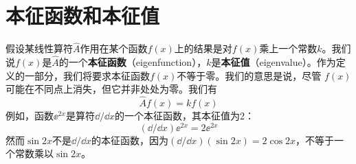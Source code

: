\section{本征函数和本征值}
\label{sec:3.2 Eigenfunctions and Eigenvalues}
	假设某线性算符$\hat{A}$作用在某个函数$f\left(x\right)$上的结果是对$f\left(x\right)$乘上一个常数$k$。我们说$f\left(x\right)$是$\hat{A}$的一个\textbf{本征函数}（eigenfunction），$k$是\textbf{本征值}（eigenvalue）。作为定义的一部分，我们将要求本征函数$f\left(x\right)$不等于零。我们的意思是说，尽管 $f\left(x\right)$ 可能在不同点上消失，但它并非处处为零。我们有
	\begin{equation}
		\boxed{
			\hat{A}f\left(x\right) = kf\left(x\right)
		}
		\label{eq:3.14 definition of eigenfunctions and eigenvalues}
	\end{equation}
	例如，函数$\ee ^{2x}$是算符$\dd /\dd x$的一个本征函数，其本征值为2：
	\begin{equation*}
		\left(\dd /\dd x\right)\ee ^{2x} = 2 \ee ^{2x}
	\end{equation*}
	然而$\sin 2x$不是$\dd /\dd x$的本征函数，因为$\left(\dd /\dd x\right)\left(\sin 2x\right) = 2 \cos 2x$，不等于一个常数乘以$\sin 2x$。
